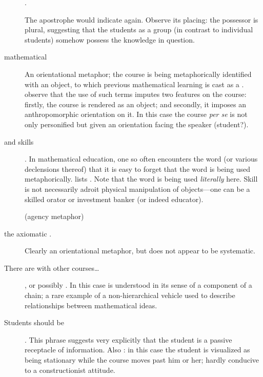 \begin{description}
  .
\item[\metaphor{students'}]\qquad The apostrophe would indicate
   again.  Observe its placing: the
  possessor is plural, suggesting that the students as a group (in
  contrast to individual students) somehow possess the knowledge in
  question.
\item[mathematical \metaphor{background}]\qquad An orientational
  metaphor; the course is being metaphorically identified with an
  object, to which previous mathematical learning is cast as a
  .  observe that the use of
  such terms imputes two features on the course: firstly, the course
  is rendered as an object; and secondly, it imposes an
  anthropomorphic orientation on it.  In this case the course
  \emph{per se} is not only personified but given an orientation
  facing the speaker (student?).
\item[and \metaphor{manipulative} skills]\qquad{}.  In mathematical education, one so often encounters the
  word  (or various declensions thereof) that it is
  easy to forget that the word is being used metaphorically.
   lists .  Note that the word  is being used
  \emph{literally} here.  Skill is not necessarily adroit physical
  manipulation of objects---one can be a skilled orator or investment
  banker (or indeed educator).
\item[\metaphor{by its use of}]\qquad(agency metaphor)
\item[the axiomatic \metaphor{approach}.]\qquad Clearly an orientational
  metaphor, but does not appear to be systematic.
\item[There are \metaphor{links} with other
  courses\ldots]\qquad{}, or possibly
  .  In this case  is
  understood in its sense of a component of a chain; a rare example of
  a non-hierarchical vehicle used to describe relationships between
  mathematical ideas.
\item[Students should be \metaphor{left with}]\qquad{}.  This phrase suggests very explicitly that the
  student is a passive receptacle of information.  Also : in this case the student is visualized as
  being stationary while the course moves past him or her; hardly
  conducive to a constructionist attitude.

\end{description}
